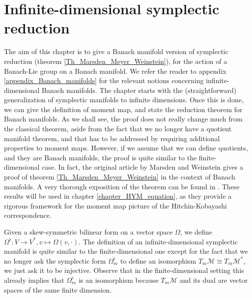 \chapter{Infinite-dimensional symplectic reduction} \label{Chapter_inf_dim_sympl_red}
The aim of this chapter is to give a Banach manifold version of symplectic reduction (theorem \ref{Th_Marsden_Meyer_Weinstein}), for the action of a Banach-Lie group on a Banach manifold. We refer the reader to appendix \ref{appendix_Banach_manifolds} for the relevant notions concerning infinite-dimensional Banach manifolds. The chapter starts with the (straightforward) generalization of symplectic manifolds to infinite dimensions. Once this is done, we can give the definition of moment map, and state the reduction theorem for Banach manifolds. As we shall see, the proof does not really change much from the classical theorem, aside from the fact that we no longer have a quotient manifold theorem, and that has to be addressed by requiring additional properties to moment maps. However, if we assume that we can define quotients, and they are Banach manifolds, the proof is quite similar to the finite-dimensional case. In fact, the original article by Marsden and Weinstein \parencite{MARSDEN1974121} gives a proof of theorem \ref{Th_Marsden_Meyer_Weinstein} in the context of Banach manifolds. A very thorough exposition of the theorem can be found in \parencite{Gianetto}. These results will be used in chapter \ref{chapter_HYM_equation}, as they provide a rigorous framework for the moment map picture of the Hitchin-Kobayashi correspondence. 

Given a skew-symmetric bilinear form on a vector space \(\Omega\), we define \(\Omega^\flat\colon V \to V^*, v \mapsto \Omega(v, \cdot)\). The definition of an infinite-dimensional symplectic manifold is quite similar to the finite-dimensional one except for the fact that we no longer ask the symplectic form \(\Omega^\flat_m\) to define an isomorphism \(T_m\mathcal{M}\cong T_m\mathcal{M}^*\), we just ask it to be injective. Observe that in the finite-dimensional setting this already implies that \(\Omega^\flat_m\) is an isomorphism because \(T_m\mathcal{M}\) and its dual are vector spaces of the same finite dimension.

